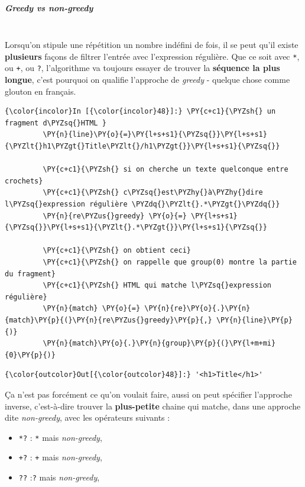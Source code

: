     \hypertarget{greedy-vs-non-greedy}{%
\subparagraph{\texorpdfstring{Greedy \emph{vs}
non-greedy}{Greedy vs non-greedy}\\\\}\label{greedy-vs-non-greedy}}

    Lorsqu'on stipule une répétition un nombre indéfini de fois, il se peut
qu'il existe \textbf{plusieurs} façons de filtrer l'entrée avec
l'expression régulière. Que ce soit avec \texttt{*}, ou \texttt{+}, ou
\texttt{?}, l'algorithme va toujours essayer de trouver la
\textbf{séquence la plus longue}, c'est pourquoi on qualifie l'approche
de \emph{greedy} - quelque chose comme glouton en français.

    \begin{Verbatim}[commandchars=\\\{\}]
{\color{incolor}In [{\color{incolor}48}]:} \PY{c+c1}{\PYZsh{} un fragment d\PYZsq{}HTML }
         \PY{n}{line}\PY{o}{=}\PY{l+s+s1}{\PYZsq{}}\PY{l+s+s1}{\PYZlt{}h1\PYZgt{}Title\PYZlt{}/h1\PYZgt{}}\PY{l+s+s1}{\PYZsq{}}
         
         \PY{c+c1}{\PYZsh{} si on cherche un texte quelconque entre crochets}
         \PY{c+c1}{\PYZsh{} c\PYZsq{}est\PYZhy{}à\PYZhy{}dire l\PYZsq{}expression régulière \PYZdq{}\PYZlt{}.*\PYZgt{}\PYZdq{}}
         \PY{n}{re\PYZus{}greedy} \PY{o}{=} \PY{l+s+s1}{\PYZsq{}}\PY{l+s+s1}{\PYZlt{}.*\PYZgt{}}\PY{l+s+s1}{\PYZsq{}}
         
         \PY{c+c1}{\PYZsh{} on obtient ceci}
         \PY{c+c1}{\PYZsh{} on rappelle que group(0) montre la partie du fragment}
         \PY{c+c1}{\PYZsh{} HTML qui matche l\PYZsq{}expression régulière}
         \PY{n}{match} \PY{o}{=} \PY{n}{re}\PY{o}{.}\PY{n}{match}\PY{p}{(}\PY{n}{re\PYZus{}greedy}\PY{p}{,} \PY{n}{line}\PY{p}{)}
         \PY{n}{match}\PY{o}{.}\PY{n}{group}\PY{p}{(}\PY{l+m+mi}{0}\PY{p}{)}
\end{Verbatim}


\begin{Verbatim}[commandchars=\\\{\}]
{\color{outcolor}Out[{\color{outcolor}48}]:} '<h1>Title</h1>'
\end{Verbatim}
            
    Ça n'est pas forcément ce qu'on voulait faire, aussi on peut spécifier
l'approche inverse, c'est-à-dire trouver la \textbf{plus-petite} chaine
qui matche, dans une approche dite \emph{non-greedy}, avec les
opérateurs suivants :

\begin{itemize}
	\item 
	\texttt{*?} : \texttt{*} mais \emph{non-greedy},
	\item
	\texttt{+?} : \texttt{+} mais \emph{non-greedy},
	\item
	\texttt{??} :\texttt{?} mais \emph{non-greedy},
\end{itemize}

